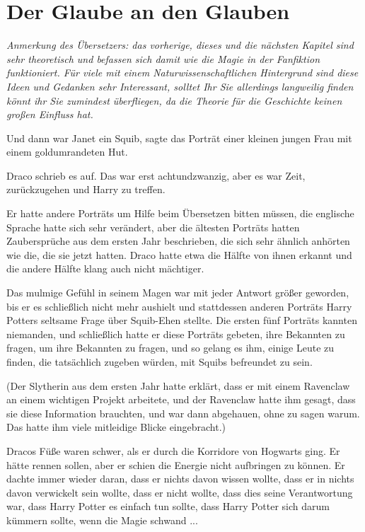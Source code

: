 \chapter{Der Glaube an den Glauben}

\emph{Anmerkung des Übersetzers: das vorherige, dieses und die nächsten Kapitel
sind sehr theoretisch und befassen sich damit wie die Magie in der Fanfiktion
funktioniert. Für viele mit einem Naturwissenschaftlichen Hintergrund sind diese
Ideen und Gedanken sehr Interessant, solltet Ihr Sie allerdings langweilig
finden könnt ihr Sie zumindest überfliegen, da die Theorie für die Geschichte
keinen großen Einfluss hat.}

\glqq{}Und dann war Janet ein Squib\grqq{}, sagte das Porträt einer kleinen
jungen Frau mit einem goldumrandeten Hut.

Draco schrieb es auf. Das war erst achtundzwanzig, aber es war Zeit,
zurückzugehen und Harry zu treffen.

Er hatte andere Porträts um Hilfe beim Übersetzen bitten müssen, die englische
Sprache hatte sich sehr verändert, aber die ältesten Porträts hatten
Zaubersprüche aus dem ersten Jahr beschrieben, die sich sehr ähnlich anhörten
wie die, die sie jetzt hatten. Draco hatte etwa die Hälfte von ihnen erkannt und
die andere Hälfte klang auch nicht mächtiger.

Das mulmige Gefühl in seinem Magen war mit jeder Antwort größer geworden, bis er
es schließlich nicht mehr aushielt und stattdessen anderen Porträts Harry
Potters seltsame Frage über Squib-Ehen stellte. Die ersten fünf Porträts kannten
niemanden, und schließlich hatte er diese Porträts gebeten, ihre Bekannten zu
fragen, um ihre Bekannten zu fragen, und so gelang es ihm, einige Leute zu
finden, die tatsächlich zugeben würden, mit Squibs befreundet zu sein.

(Der Slytherin aus dem ersten Jahr hatte erklärt, dass er mit einem Ravenclaw an
einem wichtigen Projekt arbeitete, und der Ravenclaw hatte ihm gesagt, dass sie
diese Information brauchten, und war dann abgehauen, ohne zu sagen warum. Das
hatte ihm viele mitleidige Blicke eingebracht.)

Dracos Füße waren schwer, als er durch die Korridore von Hogwarts ging. Er hätte
rennen sollen, aber er schien die Energie nicht aufbringen zu können. Er dachte
immer wieder daran, dass er nichts davon wissen wollte, dass er in nichts davon
verwickelt sein wollte, dass er nicht wollte, dass dies seine Verantwortung war,
dass Harry Potter es einfach tun sollte, dass Harry Potter sich darum kümmern
sollte, wenn die Magie schwand ...

